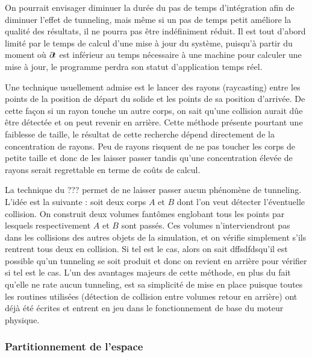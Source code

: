

On pourrait envisager diminuer la durée du pas de temps d'intégration
afin de diminuer l'effet de tunneling, mais même si un pas de temps
petit améliore la qualité des résultats, il ne pourra pas être
indéfiniment réduit. Il est tout d'abord limité par le temps de calcul
d'une mise à jour du système, puisqu'à partir du moment o\`u $\partial \!
t$ est inférieur au temps nécessaire à une machine pour calculer une
mise à jour, le programme perdra son statut d'application temps réel.

Une technique usuellement admise est le lancer des rayons (raycasting)
entre les points de la position de départ du solide et les points de
sa position d'arrivée. De cette façon si un rayon touche un autre
corps, on sait qu'une collision aurait dûe être détectée et on peut
revenir en arrière. Cette méthode présente pourtant une faiblesse de
taille, le résultat de cette recherche dépend directement de la
concentration de rayons. Peu de rayons risquent de ne pas toucher les
corps de petite taille et donc de les laisser passer tandis qu'une
concentration élevée de rayons serait regrettable en terme de coûts de
calcul.



La technique du ??? permet de ne laisser passer aucun phénomène de
tunneling. L'idée est la suivante : soit deux corps $A$ et $B$ dont
l'on veut détecter l'éventuelle collision. On construit deux volumes
fantômes englobant tous les points par lesquels respectivement $A$ et
$B$ sont passés. Ces volumes n'interviendront pas dans les collisions
des autres objets de la simulation, et on vérifie simplement s'ils
rentrent tous deux en collision. Si tel est le cas, alors on sait
dffsdfdsqu'il est possible qu'un tunneling se soit produit et donc on revient
en arrière pour vérifier si tel est le cas. L'un des avantages majeurs
de cette méthode, en plus du fait qu'elle ne rate aucun tunneling, est
sa simplicité de mise en place puisque toutes les routines utilisées
(détection de collision entre volumes retour en arrière) ont déjà été
écrites et entrent en jeu dans le fonctionnement de base du moteur
physique.



\subsubsection{Partitionnement de l'espace}


